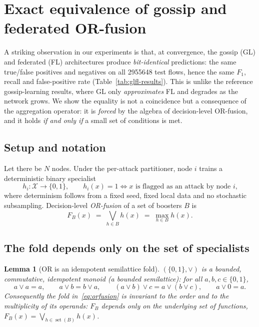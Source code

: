 \documentclass[11pt]{article}
\newtheorem{lemma}{Lemma}
\theoremstyle{remark}
\newcommand{\XX}{\mathcal{X}}
\newcommand{\Fset}{F}
\begin{document}
\section{Exact equivalence of gossip and federated OR-fusion}
\label{sec:gl-fl-equivalence}

A striking observation in our experiments is that, at convergence, the
gossip (GL) and federated (FL) architectures produce \emph{bit-identical}
predictions: the same true/false positives and negatives on all
\num{2955648} test flows, hence the same $F_1$, recall and false-positive rate
(Table~\ref{tab:glfl-results}). This is unlike the reference gossip-learning
results, where GL only \emph{approximates} FL and degrades as the network grows.
We show the equality is not a coincidence but a consequence of the aggregation
operator: it is \emph{forced} by the algebra of decision-level OR-fusion, and it
holds \emph{if and only if} a small set of conditions is met.

\subsection{Setup and notation}

Let there be $N$ nodes. Under the per-attack partitioner, node $i$ trains a
deterministic binary specialist
\[
  h_i:\XX\to\{0,1\},\qquad h_i(x)=1 \iff \text{$x$ is flagged as an attack by node $i$,}
\]
where determinism follows from a fixed seed, fixed local data and no
stochastic subsampling. Decision-level \emph{OR-fusion} of a set of boosters
$B$ is
\begin{equation}
  \Fset_B(x)\;=\;\bigvee_{h\in B} h(x)\;=\;\max_{h\in B} h(x).
  \label{eq:orfusion}
\end{equation}

\subsection{The fold depends only on the set of specialists}

\begin{lemma}[OR is an idempotent semilattice fold]
\label{lem:semilattice}
$(\{0,1\},\vee)$ is a bounded, commutative, idempotent monoid (a bounded
semilattice): for all $a,b,c\in\{0,1\}$,
\[
  a\vee a=a,\qquad a\vee b=b\vee a,\qquad (a\vee b)\vee c=a\vee(b\vee c),\qquad a\vee 0=a.
\]
Consequently the fold in~\eqref{eq:orfusion} is invariant to the order and to
the multiplicity of its operands: $\Fset_B$ depends only on the underlying
\emph{set} of functions, $\Fset_B(x)=\bigvee_{h\in\operatorname{set}(B)}h(x)$.
\end{lemma}
\end{document}

